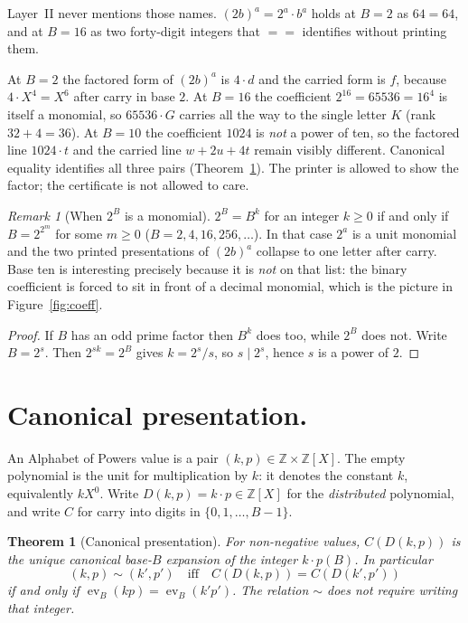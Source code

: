 \documentclass{article}
\DeclareMathOperator{\ev}{ev}
\newcommand{\ZZ}{\mathbb{Z}}
\newcommand{\eqc}{\mathrel{\mathtt{==}}}
\theoremstyle{plain}
\newtheorem{theorem}{Theorem}
\theoremstyle{definition}
\theoremstyle{remark}
\newtheorem*{remark}{Remark}
\begin{document}
Layer~II never mentions those names. \((2b)^a = 2^a \cdot b^a\) holds at
\(B=2\) as \(64=64\), and at \(B=16\) as two forty-digit integers that
\(\eqc\) identifies without printing them.

At \(B=2\) the factored form of \((2b)^a\) is \(4\cdot d\) and the
carried form is \(f\), because \(4\cdot X^4 = X^6\) after carry in base
\(2\). At \(B=16\) the coefficient \(2^{16}=65536=16^4\) is itself a
monomial, so \(65536\cdot G\) carries all the way to the single letter
\(K\) (rank \(32+4=36\)). At \(B=10\) the coefficient \(1024\) is
\emph{not} a power of ten, so the factored line \(1024\cdot t\) and the
carried line \(w+2u+4t\) remain visibly different. Canonical equality
identifies all three pairs (Theorem~\ref{thm:canonical}). The printer is
allowed to show the factor; the certificate is not allowed to care.

\begin{remark}[When \(2^B\) is a monomial]
\(2^B = B^k\) for an integer \(k \ge 0\) if and only if
\(B = 2^{2^m}\) for some \(m \ge 0\)
(\(B = 2, 4, 16, 256, \ldots\)). In that case \(2^a\) is a unit monomial
and the two printed presentations of \((2b)^a\) collapse to one letter
after carry. Base ten is interesting precisely because it is \emph{not}
on that list: the binary coefficient is forced to sit in front of a
decimal monomial, which is the picture in Figure~\ref{fig:coeff}.
\end{remark}

\begin{proof}
If \(B\) has an odd prime factor then \(B^k\) does too, while \(2^B\)
does not. Write \(B=2^s\). Then \(2^{sk}=2^B\) gives \(k=2^s/s\), so
\(s \mid 2^s\), hence \(s\) is a power of \(2\).
\end{proof}

\section{Canonical presentation.}
\label{sec:canonical}

An Alphabet of Powers value is a pair
\((k,p) \in \ZZ \times \ZZ[X]\). The empty polynomial is the unit for
multiplication by \(k\): it denotes the constant \(k\), equivalently
\(k X^0\). Write \(D(k,p) = k\cdot p \in \ZZ[X]\) for the
\emph{distributed} polynomial, and write \(C\) for carry into digits in
\(\{0,1,\dots,B-1\}\).

\begin{theorem}[Canonical presentation]
\label{thm:canonical}
For non-negative values, \(C(D(k,p))\) is the unique canonical base-\(B\)
expansion of the integer \(k\cdot p(B)\). In particular
\[
(k,p) \sim (k',p') \quad\text{iff}\quad C(D(k,p)) = C(D(k',p'))
\]
if and only if \(\ev_B(k p) = \ev_B(k' p')\). The relation \(\sim\) does
not require writing that integer.
\end{theorem}
\end{document}
